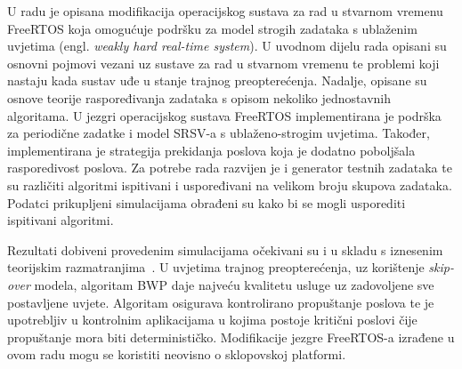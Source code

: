 \documentclass[../zavrsni.tex]{subfiles}
\begin{document}
\sloppy

\justifying

U radu je opisana modifikacija operacijskog sustava za rad u stvarnom vremenu FreeRTOS koja omogućuje podršku za model strogih zadataka s ublaženim uvjetima (engl. \textit{weakly hard real-time system}). U uvodnom dijelu rada opisani su osnovni pojmovi vezani uz sustave za 
rad u stvarnom vremenu te problemi koji nastaju kada sustav uđe u stanje trajnog preopterećenja. Nadalje, opisane su osnove teorije raspoređivanja 
zadataka s opisom nekoliko jednostavnih algoritama. 
U jezgri operacijskog sustava FreeRTOS implementirana je podrška za periodične zadatke i model SRSV-a s ublaženo-strogim uvjetima.
Također, implementirana je strategija prekidanja poslova koja je dodatno poboljšala rasporedivost poslova.
Za potrebe rada razvijen je i generator testnih zadataka te su različiti algoritmi ispitivani i uspoređivani na velikom broju skupova zadataka.
Podatci prikupljeni simulacijama obrađeni su kako bi se mogli usporediti ispitivani algoritmi.

Rezultati dobiveni provedenim simulacijama očekivani su i u skladu s iznesenim teorijskim razmatranjima~\cite{knjiga_buttazzo}. U uvjetima trajnog preopterećenja, uz korištenje \textit{skip-over} modela,  
algoritam BWP daje najveću kvalitetu usluge uz zadovoljene sve postavljene uvjete. Algoritam osigurava kontrolirano propuštanje poslova te je upotrebljiv 
u kontrolnim aplikacijama u kojima postoje kritični poslovi čije propuštanje mora biti determinističko. Modifikacije jezgre FreeRTOS-a izrađene u ovom radu mogu se koristiti neovisno o sklopovskoj platformi.
\end{document}
